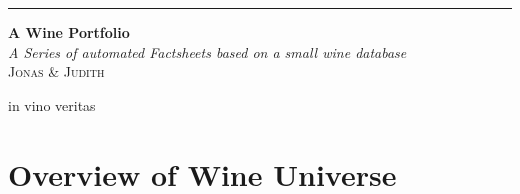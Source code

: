 \documentclass{article}
\begin{document}
 


 \begin{titlepage}
 	\raggedleft %
	
	\rule{1pt}{\textheight} %
	\hspace{0.05\textwidth} %
	\parbox[b]{0.75\textwidth}{ %
		
		{\Huge\bfseries A Wine Portfolio \\[0.5\baselineskip]}  %
		{\large\textit{A Series of automated Factsheets based on a small wine database}}\\[4\baselineskip] %
		{\Large\textsc{Jonas \& Judith}} %
		
		\vspace{0.5\textheight} %
		
		{\noindent in vino veritas }\\[\baselineskip] %
	}

\end{titlepage}
\newpage
\section{Overview of Wine Universe}
\newpage
\end{document}
